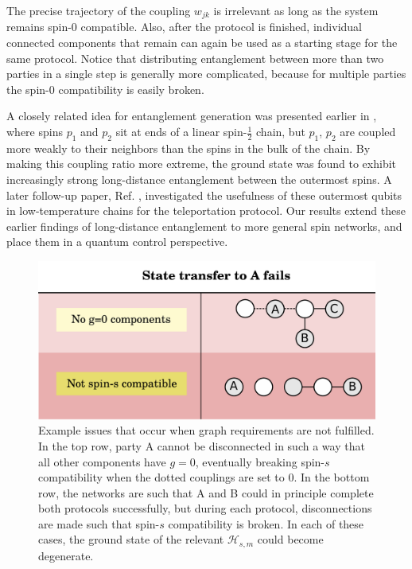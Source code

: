 The precise trajectory of the coupling $w_{jk}$ is irrelevant as long as the system remains spin-$0$ compatible.  Also, after the protocol is finished, individual connected components that remain can again be used as a starting stage for the same protocol. Notice that distributing entanglement between more than two parties in a single step is generally more complicated, because for multiple parties the spin-$0$ compatibility is easily broken.

A closely related idea for entanglement generation was presented earlier in \cite{CamposVenuti2006}, where spins $p_1$ and $p_2$ sit at ends of a linear spin-$\frac{1}{2}$ chain, but $p_1$, $p_2$ are coupled more weakly to their neighbors than the spins in the bulk of the chain. By making this coupling ratio more extreme, the ground state was found to exhibit increasingly strong long-distance entanglement between the outermost spins. A later follow-up paper, Ref. \cite{CamposVenuti2007}, investigated the usefulness of these outermost qubits in low-temperature chains for the teleportation protocol. Our results extend these earlier findings of long-distance entanglement to more general spin networks, and place them in a quantum control perspective. 


\begin{figure}
\centering
\includegraphics[width=.6\textwidth]{img_manuscript/applications_example_problems_half.pdf} 
\caption{Example issues that occur when graph requirements are not fulfilled. In the top row, party A cannot be disconnected in such a way that all other components have $g=0$, eventually breaking spin-$s$ compatibility when the dotted couplings are set to $0$. In the bottom row, the networks are such that A and B could in principle complete both protocols successfully, but during each protocol, disconnections are made such that spin-$s$ compatibility is broken. In each of these cases, the ground state of the relevant $\mathcal{H}_{s,m}$ could become degenerate. }
\label{fig:possible_problems}
\end{figure}

